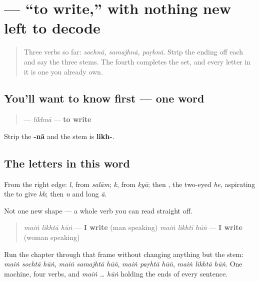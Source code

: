 \section[\texorpdfstring{\ur{لکھنا} (likhnā)}{لکھنا (likhnā)}]{ — “to write,” with nothing new left to decode}

\label{lesson:UR-C07-likhna}



\begin{quote}
Three verbs so far: \emph{sochnā, samajhnā, paṛhnā}. Strip the ending off each and say the three stems. The fourth completes the set, and every letter in it is one you already own.
\end{quote}

\subsection*{You'll want to know first — one word}
\begin{quote}
\textbf{} — \emph{likhnā} — \textbf{to write}
\end{quote}

Strip the \textbf{-nā} and the stem is \textbf{likh-}.

\subsection*{The letters in this word}
From the right edge: \textbf{} \emph{l}, from \textbf{} \emph{salām}; \textbf{} \emph{k}, from \textbf{} \emph{kyā}; then \textbf{}, the two-eyed \emph{he}, aspirating the \textbf{} to give \textbf{} \emph{kh}; then \textbf{} \emph{n} and \textbf{} long \emph{ā}.

Not one new shape — a whole verb you can read straight off.

\begin{grammarlens}[title={Grammar Lens: all four in the frame}]
\begin{quote}
\emph{maiṅ likhtā hūṅ} — \textbf{I write} (man speaking) \emph{maiṅ likhtī hūṅ} — \textbf{I write} (woman speaking)
\end{quote}

Run the chapter through that frame without changing anything but the stem: \emph{maiṅ sochtā hūṅ}, \emph{maiṅ samajhtā hūṅ}, \emph{maiṅ paṛhtā hūṅ}, \emph{maiṅ likhtā hūṅ}. One machine, four verbs, and \emph{maiṅ … hūṅ} holding the ends of every sentence.
\end{grammarlens}

